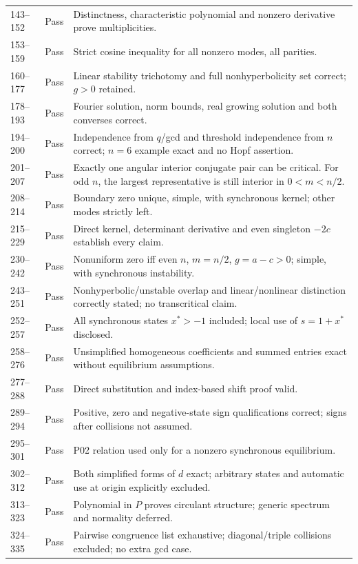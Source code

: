 \documentclass[11pt]{article}
\begin{document}
\begin{longtable}{@{}L{0.12\textwidth}L{0.12\textwidth}L{0.70\textwidth}@{}}
143--152 & Pass & Distinctness, characteristic polynomial and nonzero derivative prove multiplicities.\\
153--159 & Pass & Strict cosine inequality for all nonzero modes, all parities.\\
160--177 & Pass & Linear stability trichotomy and full nonhyperbolicity set correct; $g>0$ retained.\\
178--193 & Pass & Fourier solution, norm bounds, real growing solution and both converses correct.\\
194--200 & Pass & Independence from $q$/gcd and threshold independence from $n$ correct; $n=6$ example exact and no Hopf assertion.\\
201--207 & Pass & Exactly one angular interior conjugate pair can be critical. For odd $n$, the largest representative is still interior in $0<m<n/2$.\\
208--214 & Pass & Boundary zero unique, simple, with synchronous kernel; other modes strictly left.\\
215--229 & Pass & Direct kernel, determinant derivative and even singleton $-2c$ establish every claim.\\
230--242 & Pass & Nonuniform zero iff even $n$, $m=n/2$, $g=a-c>0$; simple, with synchronous instability.\\
243--251 & Pass & Nonhyperbolic/unstable overlap and linear/nonlinear distinction correctly stated; no transcritical claim.\\
252--257 & Pass & All synchronous states $x^*>-1$ included; local use of $s=1+x^*$ disclosed.\\
258--276 & Pass & Unsimplified homogeneous coefficients and summed entries exact without equilibrium assumptions.\\
277--288 & Pass & Direct substitution and index-based shift proof valid.\\
289--294 & Pass & Positive, zero and negative-state sign qualifications correct; signs after collisions not assumed.\\
295--301 & Pass & P02 relation used only for a nonzero synchronous equilibrium.\\
302--312 & Pass & Both simplified forms of $d$ exact; arbitrary states and automatic use at origin explicitly excluded.\\
313--323 & Pass & Polynomial in $P$ proves circulant structure; generic spectrum and normality deferred.\\
324--335 & Pass & Pairwise congruence list exhaustive; diagonal/triple collisions excluded; no extra gcd case.\\

\end{longtable}
\end{document}
